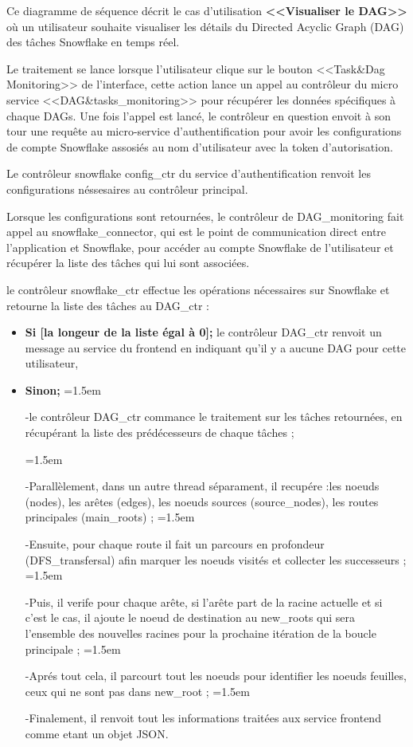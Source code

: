     \par Ce diagramme de séquence décrit le cas d'utilisation \textbf{<<Visualiser le DAG>>} où 
    un utilisateur souhaite visualiser les détails du Directed Acyclic Graph (DAG) des tâches Snowflake en temps réel. \\
    \par Le traitement se lance lorsque l'utilisateur clique sur le bouton <<Task\&Dag Monitoring>> de l'interface, 
    cette action lance un appel au contrôleur du micro service <<DAG\&tasks\_monitoring>> pour récupérer les données spécifiques à chaque DAGs.
    Une fois l'appel est lancé, le contrôleur en question envoit à son tour une requête au micro-service d'authentification pour avoir les configurations de compte Snowflake assosiés au nom d'utilisateur avec la token d'autorisation.
    \par Le contrôleur snowflake config\_ctr du service d'authentification renvoit les configurations néssesaires au contrôleur principal.
    \par Lorsque les configurations sont retournées, le contrôleur de DAG\_monitoring fait appel au snowflake\_connector, qui est le point de communication direct entre l'application et Snowflake, pour accéder au compte Snowflake de l'utilisateur et récupérer la liste des tâches qui lui sont associées.
    \par le contrôleur snowflake\_ctr effectue les opérations nécessaires sur Snowflake et retourne la liste des tâches au DAG\_ctr :
    \begin{itemize}
        \item \textbf{Si [la longeur de la liste égal à 0];} le contrôleur DAG\_ctr renvoit un message au service du frontend en indiquant qu'il y a aucune DAG pour cette utilisateur,
        \item \textbf{Sinon;} \parindent=1.5em \par -le contrôleur DAG\_ctr commance le traitement sur les tâches retournées, en récupérant la liste des prédécesseurs de chaque tâches ;
       
        \parindent=1.5em \par -Parallèlement, dans un autre thread séparament, il recupére :les noeuds (nodes), les arêtes (edges), les noeuds sources (source\_nodes), les routes principales (main\_roots) ;
        \parindent=1.5em \par -Ensuite, pour chaque route il fait un parcours en profondeur (DFS\_transfersal) afin marquer les noeuds visités et collecter les successeurs ;
        \parindent=1.5em \par -Puis, il verife pour chaque arête, si l'arête part de la racine actuelle et si c'est le cas, il ajoute le noeud de destination au new\_roots qui sera l'ensemble des nouvelles racines pour la prochaine itération de la boucle principale ;
        \parindent=1.5em \par -Aprés tout cela, il parcourt tout les noeuds pour identifier les noeuds feuilles, ceux qui ne sont pas dans new\_root ;
        \parindent=1.5em \par -Finalement, il renvoit tout les informations traitées aux service frontend comme etant un objet JSON.
                
    \end{itemize}
